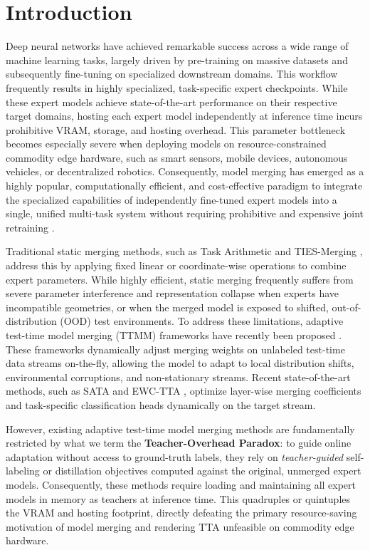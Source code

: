 \documentclass{article}
\theoremstyle{plain}
\theoremstyle{definition}
\theoremstyle{remark}
\begin{document}
\section{Introduction}
Deep neural networks have achieved remarkable success across a wide range of machine learning tasks, largely driven by pre-training on massive datasets and subsequently fine-tuning on specialized downstream domains. This workflow frequently results in highly specialized, task-specific expert checkpoints. While these expert models achieve state-of-the-art performance on their respective target domains, hosting each expert model independently at inference time incurs prohibitive VRAM, storage, and hosting overhead. This parameter bottleneck becomes especially severe when deploying models on resource-constrained commodity edge hardware, such as smart sensors, mobile devices, autonomous vehicles, or decentralized robotics. Consequently, model merging has emerged as a highly popular, computationally efficient, and cost-effective paradigm to integrate the specialized capabilities of independently fine-tuned expert models into a single, unified multi-task system without requiring prohibitive and expensive joint retraining \cite{Wortsman22,Matena22}.

Traditional static merging methods, such as Task Arithmetic \cite{Ilharco22} and TIES-Merging \cite{Yadav23}, address this by applying fixed linear or coordinate-wise operations to combine expert parameters. While highly efficient, static merging frequently suffers from severe parameter interference and representation collapse when experts have incompatible geometries, or when the merged model is exposed to shifted, out-of-distribution (OOD) test environments. To address these limitations, adaptive test-time model merging (TTMM) frameworks have recently been proposed \cite{Yang24,Jung25}. These frameworks dynamically adjust merging weights on unlabeled test-time data streams on-the-fly, allowing the model to adapt to local distribution shifts, environmental corruptions, and non-stationary streams. Recent state-of-the-art methods, such as SATA \cite{Sata26} and EWC-TTA \cite{Ewc26}, optimize layer-wise merging coefficients and task-specific classification heads dynamically on the target stream.

However, existing adaptive test-time model merging methods are fundamentally restricted by what we term the \textbf{Teacher-Overhead Paradox}: to guide online adaptation without access to ground-truth labels, they rely on \textit{teacher-guided} self-labeling or distillation objectives computed against the original, unmerged expert models. Consequently, these methods require loading and maintaining all expert models in memory as teachers at inference time. This quadruples or quintuples the VRAM and hosting footprint, directly defeating the primary resource-saving motivation of model merging and rendering TTA unfeasible on commodity edge hardware.
\end{document}
